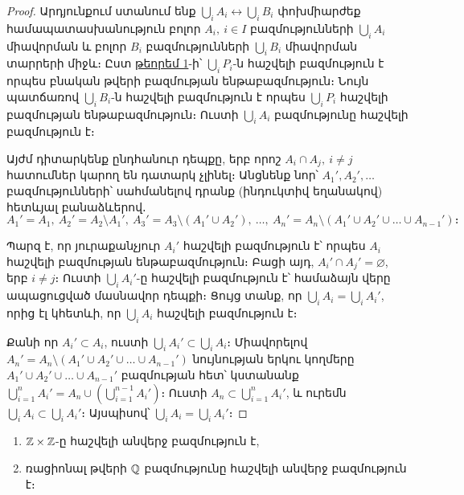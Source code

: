 \documentclass[./main.tex]{subfiles}
\begin{document}
\begin{proof}
\par Արդյունքում ստանում ենք $\bigcup\limits_i A_i \leftrightarrow \bigcup\limits_i B_i$ փոխմիարժեք համապատասխանու\-թյուն բոլոր $A_i,\ i\in I$ բազմություն\-նե\-րի $\bigcup\limits_i A_i$ միավորման և բոլոր $B_i$ բազմություն\-նե\-րի $\bigcup\limits_i B_i$ միավորման տարրերի միջև։ Ըստ \hyperref[ch3thm1]{թեորեմ 1}-ի՝ $\bigcup\limits_i P_i$-ն հաշվելի բազմություն է որպես բնական թվերի բազմության ենթաբազմություն։ Նույն պատճառով $\bigcup\limits_i B_i$-ն հաշվելի բազմություն է որպես $\bigcup\limits_i P_i$ հաշվելի բազմության ենթաբազմություն։ Ուստի $\bigcup\limits_i A_i$ բազմությունը հաշվելի բազմություն է։
\par Այժմ դիտարկենք ընդհանուր դեպքը, երբ որոշ $A_i\cap A_j,\ i\neq j$ հատումներ կարող են դատարկ չլինել։ Անցնենք նոր՝ $A_1',A_2',\dots$ բազմությունների՝ սահմանելով դրանք (ինդուկտիվ եղանակով) հետևյալ բանաձևերով․
\[
A_1'=A_1,\ A_2'=A_2\setminus A_1', \ A_3'=A_3\setminus (A_1' \cup A_2'),\ \dots,\ A_n'=A_n\setminus (A_1'\cup A_2'\cup \dots \cup A_{n-1}')։
\]
\par Պարզ է, որ յուրաքանչյուր $A_i'$ հաշվելի բազմություն է՝ որպես $A_i$ հաշվելի բազ\-մու\-թյան ենթաբազմություն։ Բացի այդ, $A_i' \cap A_j'=\varnothing$, երբ $i\neq j$։ Ուստի $\bigcup\limits_i A_i'$-ը հաշ\-վե\-լի բազմություն է՝ համաձայն վերը ապացուցված մասնավոր դեպքի։ Ցույց տանք, որ $\bigcup\limits_i A_i =\bigcup\limits_i A_i'$, որից էլ կհետևի, որ $\bigcup\limits_i A_i$ հաշվելի բազմություն է։

\par Քանի որ $A_i' \subset A_i$, ուստի $\bigcup\limits_i A_i' \subset \bigcup\limits_i A_i$։ Միավորելով $A_n'=A_n\setminus {(A_1' \cup  A_2' \cup \dots \cup  A_{n-1}')}$ նույնության երկու կողմերը $A_1'\cup  A_2'\cup \dots \cup  A_{n-1}'$ բազմության հետ՝ կստանանք $\bigcup\limits_{i=1}^n A_i'=A_n\cup \left(\bigcup\limits_{i=1}^{n-1} A_i'\right)$։ Ուստի $A_n\subset \bigcup\limits_{i=1}^n A_i'$, և ուրեմն $\bigcup\limits_i A_i \subset \bigcup\limits_i A_i'$։ Այսպիսով՝ $\bigcup\limits_i A_i=\bigcup\limits_i A_i'$։
\end{proof}
\renewcommand*{\proofname}{\hspace{18pt}\textbf{Ապացուցում։}\nopunct}
\begin{hetevanq3}\label{ch3cor2}
\begin{enumerate}
    \item[ա)] $\mathbb{Z}\times \mathbb{Z}$-ը հաշվելի անվերջ բազմություն է,
    \item[բ)] ռացիոնալ թվերի $\mathbb{Q}$ բազմությունը հաշվելի անվերջ բազմություն է։
\end{enumerate}
\end{hetevanq3}
\end{document}
